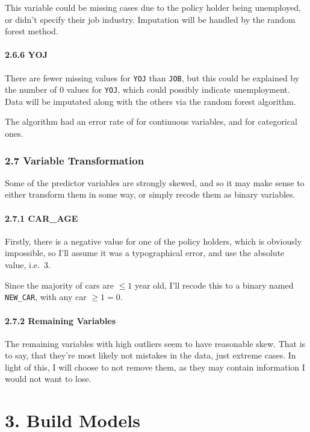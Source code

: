 \documentclass[]{article}
\let\oldparagraph\paragraph
\renewcommand{\paragraph}[1]{\oldparagraph{#1}\mbox{}}
\begin{document}
This variable could be missing cases due to the policy holder being
unemployed, or didn't specify their job industry. Imputation will be
handled by the random forest method.

\paragraph{2.6.6 YOJ}\label{yoj}

There are fewer missing values for \texttt{YOJ} than \texttt{JOB}, but
this could be explained by the number of 0 values for \texttt{YOJ},
which could possibly indicate unemployment. Data will be imputated along
with the others via the random forest algorithm.

The algorithm had an error rate of for continuous variables, and for
categorical ones.

\subsubsection{2.7 Variable
Transformation}\label{variable-transformation}

Some of the predictor variables are strongly skewed, and so it may make
sense to either transform them in some way, or simply recode them as
binary variables.

\paragraph{2.7.1 CAR\_AGE}\label{car_age-1}

Firstly, there is a negative value for one of the policy holders, which
is obviously impossible, so I'll assume it was a typographical error,
and use the absolute value, i.e.~3.

Since the majority of cars are \(\leq 1\) year old, I'll recode this to
a binary named \texttt{NEW\_CAR}, with any car \(\geq 1 = 0\).

\paragraph{2.7.2 Remaining Variables}\label{remaining-variables}

The remaining variables with high outliers seem to have reasonable skew.
That is to say, that they're most likely not mistakes in the data, just
extreme cases. In light of this, I will choose to not remove them, as
they may contain information I would not want to lose.

\section{3. Build Models}\label{build-models}
\end{document}
